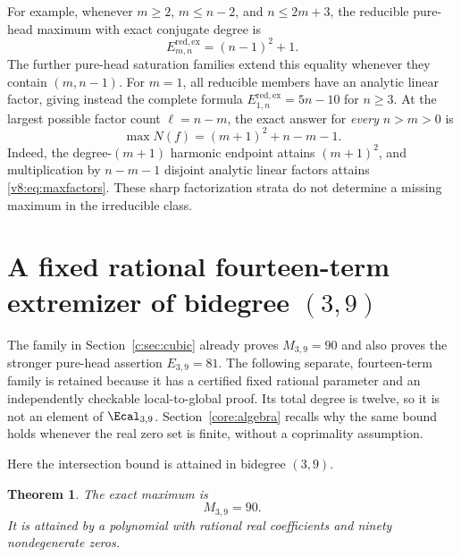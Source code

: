 \documentclass[UTF8,11pt]{ctexart}
\newtheorem{thm}{Theorem}[section]
\theoremstyle{definition}
\numberwithin{equation}{section}
\begin{document}
For example, whenever $m\ge2$, $m\le n-2$, and $n\le2m+3$,
the reducible pure-head maximum with exact conjugate degree is
\begin{equation}\label{v8:eq:purered}
 E^{\mathrm{red,ex}}_{m,n}=(n-1)^2+1.
\end{equation}
The further pure-head saturation families extend this equality
whenever they contain $(m,n-1)$. For $m=1$, all reducible members
have an analytic linear factor, giving instead the complete formula
$E^{\mathrm{red,ex}}_{1,n}=5n-10$ for $n\ge3$.
At the largest possible factor count $\ell=n-m$, the exact answer
for \emph{every} $n>m>0$ is
\begin{equation}\label{v8:eq:maxfactors}
 \max N(f)=(m+1)^2+n-m-1.
\end{equation}
Indeed, the degree-$(m+1)$ harmonic endpoint attains $(m+1)^2$,
and multiplication by $n-m-1$ disjoint analytic linear factors
attains \eqref{v8:eq:maxfactors}. These sharp factorization strata
do not determine a missing maximum in the irreducible class.


\section{A fixed rational fourteen-term extremizer of bidegree \texorpdfstring{$(3,9)$}{(3,9)}}\label{t:sec:example}
The family in Section~\ref{c:sec:cubic} already proves $M_{3,9}=90$ and
also proves the stronger pure-head assertion $E_{3,9}=81$. The following
separate, fourteen-term family is retained because it has a certified
fixed rational parameter and an independently checkable local-to-global
proof. Its total degree is twelve, so it is not an element of
$\Ecal_{3,9}$.
Section~\ref{core:algebra} recalls why the same bound holds whenever
the real zero set is finite, without a coprimality assumption.

Here the intersection bound is attained in bidegree $(3,9)$.
\begin{thm}\label{t:thm:main}
The exact maximum is
\[
 M_{3,9}=90.
\]
It is attained by a polynomial with rational real coefficients and
ninety nondegenerate zeros.
\end{thm}
\end{document}
